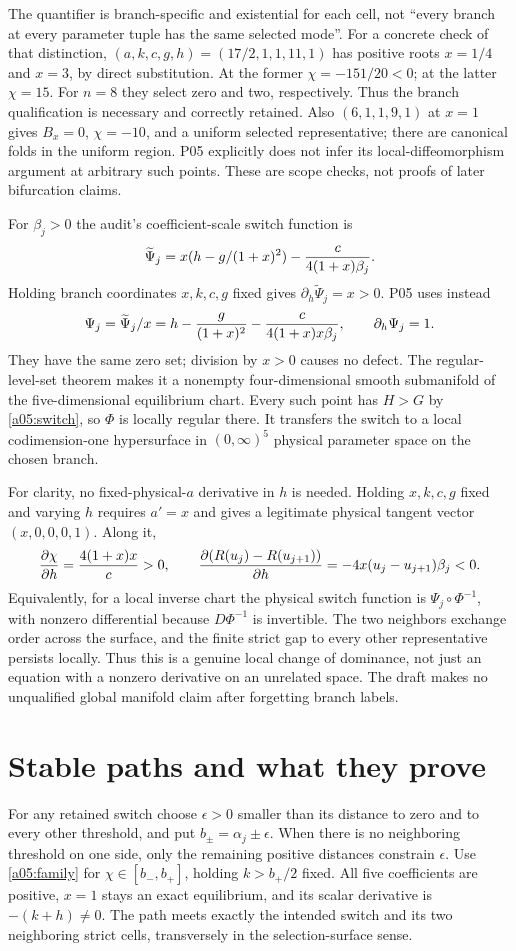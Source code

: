 \documentclass[11pt]{article}
\begin{document}
The quantifier is branch-specific and existential for each cell, not
``every branch at every parameter tuple has the same selected mode''.
For a concrete check of that distinction, $(a,k,c,g,h)=(17/2,1,1,11,1)$
has positive roots $x=1/4$ and $x=3$, by direct substitution. At the
former $\chi=-151/20<0$; at the latter $\chi=15$. For $n=8$ they
select zero and two, respectively. Thus the branch qualification is
necessary and correctly retained. Also $(6,1,1,9,1)$ at $x=1$ gives
$B_x=0$, $\chi=-10$, and a uniform selected representative; there
are canonical folds in the uniform region. P05 explicitly does not
infer its local-diffeomorphism argument at arbitrary such points.
These are scope checks, not proofs of later bifurcation claims.

For $\beta_j>0$ the audit's coefficient-scale switch function is
\[
 \widetilde\Psi_j=x(h-g/(1+x)^2)-{c\over4(1+x)\beta_j}.
\]
Holding branch coordinates $x,k,c,g$ fixed gives
$\partial_h\widetilde\Psi_j=x>0$. P05 uses instead
\[
 \Psi_j=\widetilde\Psi_j/x
 =h-{g\over(1+x)^2}-{c\over4(1+x)x\beta_j},
 \qquad\partial_h\Psi_j=1.
\]
They have the same zero set; division by $x>0$ causes no defect. The
regular-level-set theorem makes it a nonempty four-dimensional smooth
submanifold of the five-dimensional equilibrium chart. Every such point
has $H>G$ by \eqref{a05:switch}, so $\Phi$ is locally regular there.
It transfers the switch to a local codimension-one hypersurface in
$(0,\infty)^5$ physical parameter space on the chosen branch.

For clarity, no fixed-physical-$a$ derivative in $h$ is needed. Holding
$x,k,c,g$ fixed and varying $h$ requires $a'=x$ and gives a legitimate
physical tangent vector $(x,0,0,0,1)$. Along it,
\[
 {\partial\chi\over\partial h}={4(1+x)x\over c}>0,
 \qquad {\partial(R(u_j)-R(u_{j+1}))\over\partial h}
 =-4x(u_j-u_{j+1})\beta_j<0.
\]
Equivalently, for a local inverse chart the physical switch function is
$\Psi_j\circ\Phi^{-1}$, with nonzero differential because $D\Phi^{-1}$
is invertible. The two neighbors exchange order across the surface,
and the finite strict gap to every other representative persists locally.
Thus this is a genuine local change of dominance, not just an equation
with a nonzero derivative on an unrelated space. The draft makes no
unqualified global manifold claim after forgetting branch labels.

\section{Stable paths and what they prove}
For any retained switch choose $\epsilon>0$ smaller than its distance
to zero and to every other threshold, and put
$b_\pm=\alpha_j\pm\epsilon$. When there is no neighboring threshold
on one side, only the remaining positive distances constrain $\epsilon$.
Use \eqref{a05:family} for $\chi\in[b_-,b_+]$, holding
$k>b_+/2$ fixed. All five coefficients are positive, $x=1$ stays an
exact equilibrium, and its scalar derivative is $-(k+h)\ne0$.
The path meets exactly the intended switch and its two neighboring
strict cells, transversely in the selection-surface sense.
\end{document}

